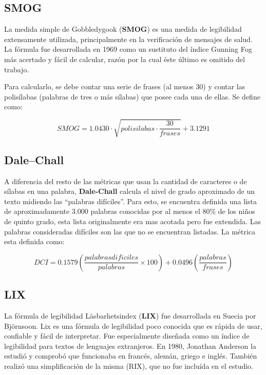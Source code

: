\documentclass[12pt,journal,compsoc]{IEEEtran}
\begin{document}
\subsection{SMOG}
La medida simple de Gobbledygook (\textbf{SMOG})\cite{smog} es una medida de legibilidad extensamente utilizada, principalmente en la verificación de mensajes de salud\cite{hedman}. La fórmula fue desarrollada en 1969 como un sustituto del índice Gunning Fog más acertado y fácil de calcular, razón por la cual éste último es omitido del trabajo.

Para calcularlo, se debe contar una serie de frases (al menos 30) y contar las polisílabas (palabras de tres o más sílabas) que posee cada una de ellas. Se define como: 

$$SMOG = 1.0430\cdot \sqrt{polisilabas \cdot \frac{30}{frases}} + 3.1291$$

\subsection{Dale–Chall}
A diferencia del resto de las métricas que usan la cantidad de caracteres o de sílabas en una palabra, \textbf{Dale-Chall}\cite{dale-chall} calcula el nivel de grado aproximado de un texto midiendo las ``palabras difíciles''. Para esto, se encuentra definida una lista de aproximadamente 3.000 palabras conocidas por al menos el 80\% de los niños de quinto grado, esta lista originalmente era mas acotada pero fue extendida\cite{dale-chall-ex}. Las palabras consideradas difíciles son las que no se encuentran listadas. La métrica esta definida como:

$$DCI = 0.1579\left({\frac{{palabras dificiles}}{{palabras}}}\times 100\right)+0.0496\left({\frac{{palabras}}{{frases}}}\right)$$

\subsection{LIX}

La fórmula de legibilidad Läsbarhetsindex (\textbf{LIX})\cite{lix-rix} fue desarrollada en Suecia por Björnsoon. Lix es una fórmula de legibilidad poco conocida que es rápida de usar, confiable y fácil de interpretar. Fue especialmente diseñada como un índice de legibilidad para textos de lenguajes extranjeros. En 1980, Jonathan Anderson la estudió y comprobó que funcionaba en francés, alemán, griego e inglés. También realizó una simplificación de la misma (RIX), que no fue incluída en el estudio.
\end{document}
